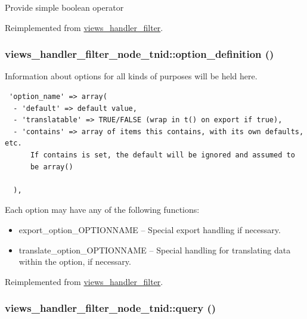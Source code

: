 Provide simple boolean operator 

Reimplemented from \hyperlink{classviews__handler__filter_8c77c0a8bba8c3ceceae8950fc7b1121}{views\_\-handler\_\-filter}.\hypertarget{classviews__handler__filter__node__tnid_ab1f73e93ba261fff47a93a698612e25}{
\subsubsection[{option\_\-definition}]{\setlength{\rightskip}{0pt plus 5cm}views\_\-handler\_\-filter\_\-node\_\-tnid::option\_\-definition ()}}
\label{classviews__handler__filter__node__tnid_ab1f73e93ba261fff47a93a698612e25}


Information about options for all kinds of purposes will be held here. 

\begin{Code}\begin{verbatim} 'option_name' => array(
  - 'default' => default value,
  - 'translatable' => TRUE/FALSE (wrap in t() on export if true),
  - 'contains' => array of items this contains, with its own defaults, etc.
      If contains is set, the default will be ignored and assumed to
      be array()

  ),
\end{verbatim}
\end{Code}

 Each option may have any of the following functions:\begin{itemize}
\item export\_\-option\_\-OPTIONNAME -- Special export handling if necessary.\item translate\_\-option\_\-OPTIONNAME -- Special handling for translating data within the option, if necessary. \end{itemize}


Reimplemented from \hyperlink{classviews__handler__filter_053c9173084f1409a92eb390854ec304}{views\_\-handler\_\-filter}.\hypertarget{classviews__handler__filter__node__tnid_7e51dd45867a8a4a3c965a09d0ecd3b6}{
\subsubsection[{query}]{\setlength{\rightskip}{0pt plus 5cm}views\_\-handler\_\-filter\_\-node\_\-tnid::query ()}}
\label{classviews__handler__filter__node__tnid_7e51dd45867a8a4a3c965a09d0ecd3b6}


